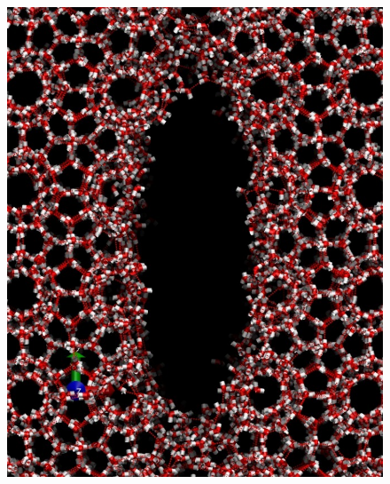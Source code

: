 \begin{figure}
\begin{minipage}[b]{0.24\linewidth}
{\includegraphics[width=\linewidth]{../pictures/snapshots_1045_280K/t_300000.pdf}}
\end{minipage}
\begin{minipage}[b]{0.24\linewidth}
\end{minipage}
\end{figure}
